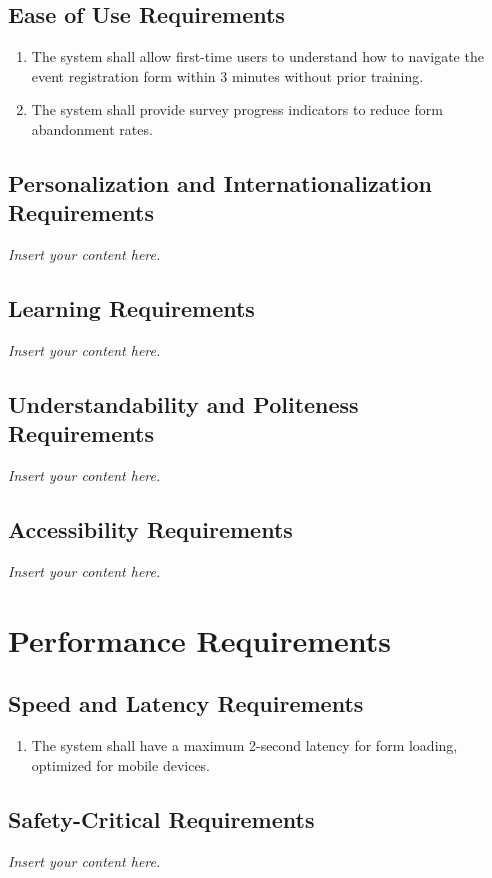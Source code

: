 \documentclass[12pt]{article}
\newcommand{\lips}{\textit{Insert your content here.}}
\begin{document}
\subsection{Ease of Use Requirements}
\begin{enumerate}[align=left,
  leftmargin=*,
  labelsep=1em,
  itemindent=0em,
  label=\bfseries UE-\arabic*:]
  \item The system shall allow first-time users to understand how to navigate the event
    registration form within 3 minutes without prior training.
  \item The system shall provide survey progress indicators to reduce form abandonment
    rates.
\end{enumerate}
\subsection{Personalization and Internationalization Requirements}
\lips
\subsection{Learning Requirements}
\lips
\subsection{Understandability and Politeness Requirements}
\lips
\subsection{Accessibility Requirements}
\lips

\section{Performance Requirements}
\subsection{Speed and Latency Requirements}
\begin{enumerate}[align=left,
  leftmargin=*,
  labelsep=1em,
  itemindent=0em,
  label=\bfseries SL-\arabic*:]
  \item The system shall have a maximum 2-second latency for form loading, optimized for
    mobile devices.
\end{enumerate}
\subsection{Safety-Critical Requirements}
\lips
\end{document}
